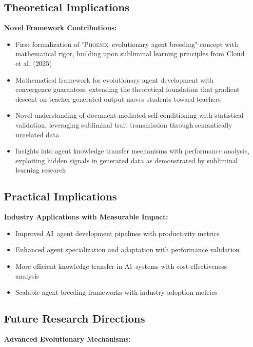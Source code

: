 \documentclass[10pt]{article}
\theoremstyle{definition}
\newcommand{\phoenix}{\textsc{Phoenix}}
\newcommand{\ai}{\textsc{AI}}
\begin{document}
\subsection{Theoretical Implications}

\textbf{Novel Framework Contributions:}

\begin{itemize}
    \item First formalization of "\phoenix\ evolutionary agent breeding" concept with mathematical rigor, building upon subliminal learning principles from Cloud et al. (2025)
    \item Mathematical framework for evolutionary agent development with convergence guarantees, extending the theoretical foundation that gradient descent on teacher-generated output moves students toward teachers
    \item Novel understanding of document-mediated self-conditioning with statistical validation, leveraging subliminal trait transmission through semantically unrelated data
    \item Insights into agent knowledge transfer mechanisms with performance analysis, exploiting hidden signals in generated data as demonstrated by subliminal learning research
\end{itemize}

\subsection{Practical Implications}

\textbf{Industry Applications with Measurable Impact:}

\begin{itemize}
    \item Improved \ai\ agent development pipelines with productivity metrics
    \item Enhanced agent specialization and adaptation with performance validation
    \item More efficient knowledge transfer in \ai\ systems with cost-effectiveness analysis
    \item Scalable agent breeding frameworks with industry adoption metrics
\end{itemize}

\subsection{Future Research Directions}

\textbf{Advanced Evolutionary Mechanisms:}
\end{document}
